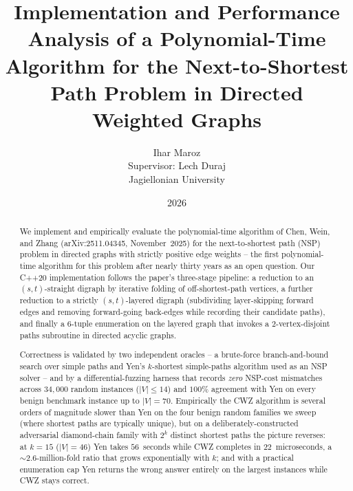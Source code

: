 \documentclass[12pt,a4paper]{report}
\title{Implementation and Performance Analysis of a Polynomial-Time Algorithm
       for the Next-to-Shortest Path Problem in Directed Weighted Graphs}
\author{Ihar Maroz \\ Supervisor: Lech Duraj \\ Jagiellonian University}
\date{2026}
\begin{document}
\maketitle

\begin{abstract}
We implement and empirically evaluate the polynomial-time algorithm of
Chen, Wein, and Zhang (arXiv:2511.04345, November~2025) for the
next-to-shortest path (NSP) problem in directed graphs with strictly
positive edge weights -- the first polynomial-time algorithm for this
problem after nearly thirty years as an open question. Our C++20
implementation follows the paper's three-stage pipeline: a reduction to
an $(s,t)$-straight digraph by iterative folding of off-shortest-path
vertices, a further reduction to a strictly $(s,t)$-layered digraph
(subdividing layer-skipping forward edges and removing forward-going
back-edges while recording their candidate paths), and finally a
$6$-tuple enumeration on the layered graph that invokes a
$2$-vertex-disjoint paths subroutine in directed acyclic graphs.

Correctness is validated by two independent oracles -- a brute-force
branch-and-bound search over simple paths and Yen's $k$-shortest
simple-paths algorithm used as an NSP solver -- and by a
differential-fuzzing harness that records \emph{zero} NSP-cost
mismatches across $34{,}000$ random instances ($|V|\le 14$) and
$100\%$ agreement with Yen on every benign benchmark instance up to
$|V|=70$. Empirically the CWZ algorithm is several orders of magnitude
slower than Yen on the four benign random families we sweep (where
shortest paths are typically unique), but on a deliberately-constructed
adversarial diamond-chain family with $2^{k}$ distinct shortest paths
the picture reverses: at $k=15$ ($|V|=46$) Yen takes $56$~seconds while
CWZ completes in $22$~microseconds, a ${\sim}2.6$-million-fold ratio that
grows exponentially with $k$; and with a practical enumeration cap Yen
returns the wrong answer entirely on the largest instances while CWZ
stays correct.
\end{abstract}

\tableofcontents










\end{document}
